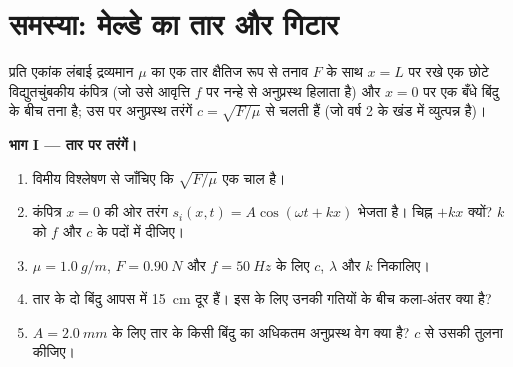 \section{समस्या: मेल्डे का तार और गिटार}

\begin{problem}[{सप्ताहांत समस्या --- प्रयोग-मेज़ पर कंपित होता एक तार, एक
घिरनी और कुछ बाट, फिर एक गिटार: अर्ध-तरंगदैर्घ्यों की गिनती कैसे फ़्रेटबोर्ड
के हर स्वर को तय कर देती है}]
\label{pb:b1:wave-propagation:1}
प्रति एकांक लंबाई द्रव्यमान $\mu$ का एक तार क्षैतिज रूप से तनाव $F$ के साथ
$x = L$ पर रखे एक छोटे विद्युतचुंबकीय कंपित्र (जो उसे आवृत्ति $f$ पर नन्हे
 से अनुप्रस्थ हिलाता है) और $x = 0$ पर एक बँधे बिंदु के बीच तना है;
उस पर अनुप्रस्थ तरंगें
$c = \sqrt{F/\mu}$ से चलती हैं (जो वर्ष 2 के खंड में व्युत्पन्न है)।

\medskip
\noindent\textbf{भाग I --- तार पर तरंगें।}
\begin{enumerate}
  \item विमीय विश्लेषण से जाँचिए कि $\sqrt{F/\mu}$ एक चाल है।
  \item कंपित्र $x = 0$ की ओर तरंग
        $s_i(x, t) = A\cos(\omega t + kx)$ भेजता है। चिह्न $+kx$ क्यों?
        $k$ को $f$ और $c$ के पदों में दीजिए।
  \item $\mu = \qty{1.0}{g/m}$, $F = \qty{0.90}{N}$ और
        $f = \qty{50}{Hz}$ के लिए $c$, $\lambda$ और $k$ निकालिए।
  \item तार के दो बिंदु आपस में \qty{15}{cm} दूर हैं। इस  के
        लिए उनकी गतियों के बीच कला-अंतर क्या है?
  \item $A = \qty{2.0}{mm}$ के लिए तार के किसी बिंदु का अधिकतम अनुप्रस्थ
        वेग क्या है? $c$ से उसकी तुलना कीजिए।
\end{enumerate}


\end{problem}
